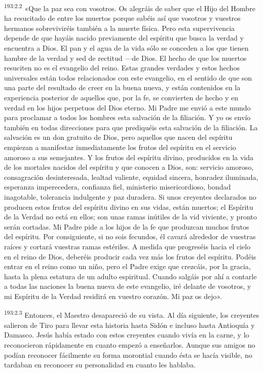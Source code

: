\par 
\textsuperscript{193:2.2} «Que la paz sea con vosotros. Os alegráis de saber que el Hijo del Hombre ha resucitado de entre los muertos porque sabéis así que vosotros y vuestros hermanos sobreviviréis también a la muerte física. Pero esta supervivencia depende de que hayáis nacido previamente del espíritu que busca la verdad y encuentra a Dios. El pan y el agua de la vida sólo se conceden a los que tienen hambre de la verdad y sed de rectitud ---de Dios. El hecho de que los muertos resuciten no es el evangelio del reino. Estas grandes verdades y estos hechos universales están todos relacionados con este evangelio, en el sentido de que son una parte del resultado de creer en la buena nueva, y están contenidos en la experiencia posterior de aquellos que, por la fe, se convierten de hecho y en verdad en los hijos perpetuos del Dios eterno. Mi Padre me envió a este mundo para proclamar a todos los hombres esta salvación de la filiación. Y yo os envío también en todas direcciones para que prediquéis esta salvación de la filiación. La salvación es un don gratuito de Dios, pero aquellos que nacen del espíritu empiezan a manifestar inmediatamente los frutos del espíritu en el servicio amoroso a sus semejantes. Y los frutos del espíritu divino, producidos en la vida de los mortales nacidos del espíritu y que conocen a Dios, son: servicio amoroso, consagración desinteresada, lealtad valiente, equidad sincera, honradez iluminada, esperanza imperecedera, confianza fiel, ministerio misericordioso, bondad inagotable, tolerancia indulgente y paz duradera. Si unos creyentes declarados no producen estos frutos del espíritu divino en sus vidas, están muertos; el Espíritu de la Verdad no está en ellos; son unas ramas inútiles de la vid viviente, y pronto serán cortadas. Mi Padre pide a los hijos de la fe que produzcan muchos frutos del espíritu. Por consiguiente, si no sois fecundos, él cavará alrededor de vuestras raíces y cortará vuestras ramas estériles. A medida que progreséis hacia el cielo en el reino de Dios, deberéis producir cada vez más los frutos del espíritu. Podéis entrar en el reino como un niño, pero el Padre exige que crezcáis, por la gracia, hasta la plena estatura de un adulto espiritual. Cuando salgáis por ahí a contarle a todas las naciones la buena nueva de este evangelio, iré delante de vosotros, y mi Espíritu de la Verdad residirá en vuestro corazón. Mi paz os dejo».

\par 
\textsuperscript{193:2.3} Entonces, el Maestro desapareció de su vista. Al día siguiente, los creyentes salieron de Tiro para llevar esta historia hasta Sidón e incluso hasta Antioquía y Damasco. Jesús había estado con estos creyentes cuando vivía en la carne, y lo reconocieron rápidamente en cuanto empezó a enseñarlos. Aunque sus amigos no podían reconocer fácilmente su forma morontial cuando ésta se hacía visible, no tardaban en reconocer su personalidad en cuanto les hablaba.

